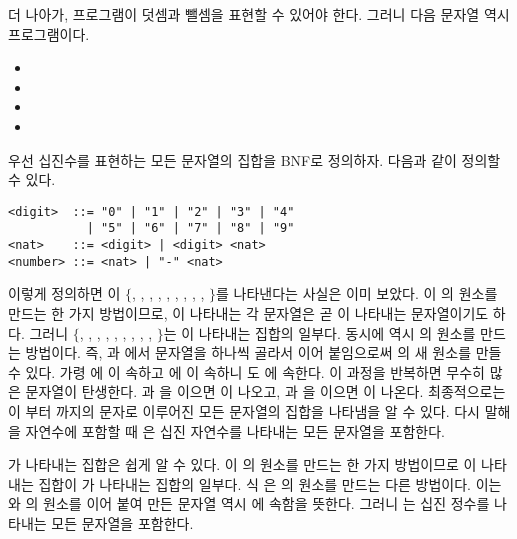 더 나아가, 프로그램이 덧셈과 뺄셈을 표현할 수 있어야 한다. 그러니 다음 문자열
역시 프로그램이다.

\begin{itemize}
  \item {}
  \item {}
  \item {}
  \item {}
\end{itemize}

우선 십진수를 표현하는 모든 문자열의 집합을 BNF로 정의하자. 다음과 같이 정의할 수 있다.

\begin{verbatim}
<digit>  ::= "0" | "1" | "2" | "3" | "4"
           | "5" | "6" | "7" | "8" | "9"
<nat>    ::= <digit> | <digit> <nat>
<number> ::= <nat> | "-" <nat>
\end{verbatim}

이렇게 정의하면 이 $\{$, , ,
, , , , , ,
$\}$를 나타낸다는 사실은 이미 보았다. 이 의
원소를 만드는 한 가지 방법이므로, 이 나타내는 각 문자열은 곧
이 나타내는 문자열이기도 하다. 그러니 $\{$, ,
, , , , , ,
, $\}$는 이 나타내는 집합의 일부다. 동시에
 역시 의 원소를 만드는 방법이다. 즉,
과 에서 문자열을 하나씩 골라서 이어 붙임으로써
의 새 원소를 만들 수 있다. 가령 에 이 속하고
에 이 속하니 도 에 속한다. 이
과정을 반복하면 무수히 많은 문자열이 탄생한다. 과 을 이으면
이 나오고, 과 을 이으면 이
나온다. 최종적으로는 이 부터 까지의 문자로
이루어진 모든 문자열의 집합을 나타냄을 알 수 있다. 다시 말해 을 자연수에
포함할 때 은 십진 자연수를 나타내는 모든 문자열을 포함한다.

가 나타내는 집합은 쉽게 알 수 있다. 이
의 원소를 만드는 한 가지 방법이므로 이 나타내는
집합이 가 나타내는 집합의 일부다. 식 은
의 원소를 만드는 다른 방법이다. 이는 와 의
원소를 이어 붙여 만든 문자열 역시 에 속함을 뜻한다. 그러니
는 십진 정수를 나타내는 모든 문자열을 포함한다.

